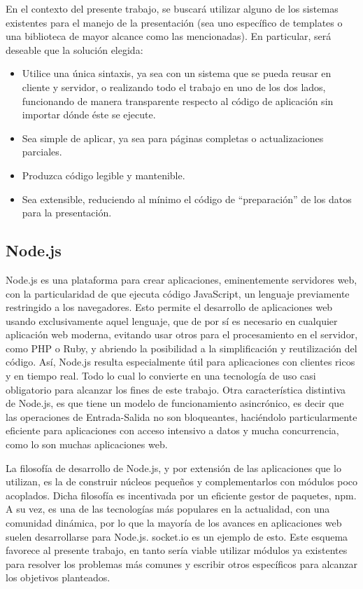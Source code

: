 \documentclass[doc,helv,longtable]{article}
\begin{document}
En el contexto del presente trabajo, se buscará utilizar alguno de los sistemas existentes para el manejo de la presentación (sea uno específico de templates o una biblioteca de mayor alcance como las mencionadas). En particular, será deseable que la solución elegida:
\begin{itemize}
\item  Utilice una única sintaxis, ya sea con un sistema que se pueda reusar en cliente y servidor, o realizando todo el trabajo en uno de los dos lados, funcionando de manera transparente respecto al código de aplicación sin importar dónde éste se ejecute. 
\item  Sea simple de aplicar, ya sea para páginas completas o actualizaciones parciales.
\item  Produzca código legible y mantenible.
\item  Sea extensible, reduciendo al mínimo el código de “preparación” de los datos para la presentación.

\end{itemize}
\subsection{Node.js}
Node.js\cite{node} es una plataforma para crear aplicaciones, eminentemente servidores web, con la particularidad de que ejecuta código JavaScript, un lenguaje previamente restringido a los navegadores. Esto permite el desarrollo de aplicaciones web usando exclusivamente aquel lenguaje, que de por sí es necesario en cualquier aplicación web moderna, evitando usar otros para el procesamiento en el servidor, como PHP o Ruby, y abriendo la posibilidad a la simplificación y reutilización del código\cite{nodenormals}\cite{nodeunderstand}. Así, Node.js resulta especialmente útil para aplicaciones con clientes ricos y en tiempo real\cite{nodeboss}. Todo lo cual lo convierte en una tecnología de uso casi obligatorio para alcanzar los fines de este trabajo. Otra característica distintiva de Node.js, es que tiene un modelo de funcionamiento asincrónico, es decir que las operaciones de Entrada-Salida no son bloqueantes, haciéndolo particularmente eficiente para aplicaciones con acceso intensivo a datos y mucha concurrencia, como lo son muchas aplicaciones web.

La filosofía de desarrollo de Node.js, y por extensión de las aplicaciones que lo utilizan, es la de construir núcleos pequeños y complementarlos con módulos poco acoplados\cite{nodephilosophy}. Dicha filosofía es incentivada por un eficiente gestor de paquetes, npm\cite{npm}. A su vez, es una de las tecnologías más populares en la actualidad\cite{githubstars}, con una comunidad dinámica, por lo que la mayoría de los avances en aplicaciones web suelen desarrollarse para Node.js. socket.io\cite{socketio} es un ejemplo de esto. Este esquema favorece al presente trabajo, en tanto sería viable utilizar módulos ya existentes para resolver los problemas más comunes y escribir otros específicos para alcanzar los objetivos planteados. 
\end{document}
